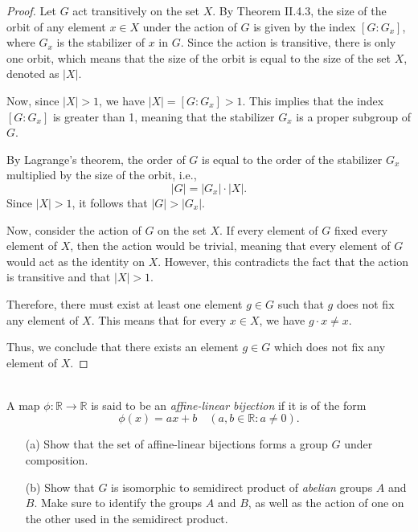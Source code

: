 \documentclass{article}
\def\rr{{\mathbb R}}
\begin{document}
\begin{proof}
    Let $G$ act transitively on the set $X$. By Theorem II.4.3, the size of the orbit of any element $x \in X$ under the action of $G$ is given by the index $[G : G_x]$, where $G_x$ is the stabilizer of $x$ in $G$. Since the action is transitive, there is only one orbit, which means that the size of the orbit is equal to the size of the set $X$, denoted as $|X|$.

    Now, since $|X| > 1$, we have $|X| = [G : G_x] > 1$. This implies that the index $[G : G_x]$ is greater than 1, meaning that the stabilizer $G_x$ is a proper subgroup of $G$. 

    By Lagrange's theorem, the order of $G$ is equal to the order of the stabilizer $G_x$ multiplied by the size of the orbit, i.e., 
    \[
    |G| = |G_x| \cdot |X|.
    \]
    Since $|X| > 1$, it follows that $|G| > |G_x|$. 

    Now, consider the action of $G$ on the set $X$. If every element of $G$ fixed every element of $X$, then the action would be trivial, meaning that every element of $G$ would act as the identity on $X$. However, this contradicts the fact that the action is transitive and that $|X| > 1$. 

    Therefore, there must exist at least one element $g \in G$ such that $g$ does not fix any element of $X$. This means that for every $x \in X$, we have $g \cdot x \neq x$. 

    Thus, we conclude that there exists an element $g \in G$ which does not fix any element of $X$.
\end{proof}


\begin{problem} \\
    A map $\phi : \rr \to \rr$ is said to be an \textit{affine-linear bijection} if it is of the form 
    \[
        \phi(x) = ax + b \quad (a,b \in \rr : a \neq 0).
    \]
    \begin{enumerate}
        \item[(a)] Show that the set of affine-linear bijections forms a group $G$ under composition. %
        \item[(b)] Show that $G$ is isomorphic to semidirect product of \textit{abelian} groups $A$ and $B$. Make sure to identify the groups $A$ and $B$, as well as the action of one on the other used in the semidirect product. %
    \end{enumerate}
\end{problem}
\end{document}
